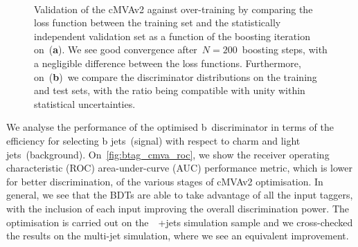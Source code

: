 \begin{figure}
\begin{centering}
 \\
\caption[The cMVAv2 BDT loss function as a function of boosting iteration]{Validation of the cMVAv2 against over-training by comparing the loss function between the training set and the statistically independent validation set as a function of the boosting iteration on~(\textbf{a}). We see good convergence after~$N=200$~boosting steps, with a negligible difference between the loss functions. Furthermore, on~(\textbf{b})~we compare the discriminator distributions on the training and test sets, with the ratio being compatible with unity within statistical uncertainties.}
\label{fig:btag_loss}
\end{centering}
\end{figure}

We analyse the performance of the optimised b~discriminator in terms of the efficiency for selecting b jets~(signal) with respect to charm and light jets~(background). On~\cref{fig:btag_cmva_roc}, we show the receiver operating characteristic (ROC) area-under-curve (AUC) performance metric, which is lower for better discrimination, of the various stages of cMVAv2 optimisation. In general, we see that the BDTs are able to take advantage of all the input taggers, with the inclusion of each input improving the overall discrimination power. The optimisation is carried out on the~\ttbar~+jets simulation sample and we cross-checked the results on the multi-jet simulation, where we see an equivalent improvement.

